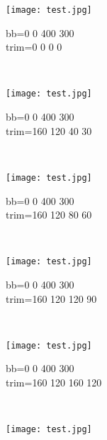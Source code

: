 \begin{figure}[h]
    \centering
    \begin{subfigure}[b]{0.3\textwidth}
        \texttt{[image: test.jpg]}
        \caption{bb=0 0 400 300\\trim=0 0 0 0}
        \label{essai_4}
    \end{subfigure}
    ~
    \begin{subfigure}[b]{0.3\textwidth}
        \texttt{[image: test.jpg]}
        \caption{bb=0 0 400 300\\trim=160 120 40 30}%
        \label{essai_5}
    \end{subfigure}
    ~
    \begin{subfigure}[b]{0.3\textwidth}
        \texttt{[image: test.jpg]}
        \caption{bb=0 0 400 300\\trim=160 120 80 60}%
        \label{essai_6}
    \end{subfigure}
    \\
    \begin{subfigure}[b]{0.3\textwidth}
        \texttt{[image: test.jpg]}
        \caption{bb=0 0 400 300\\trim=160 120 120 90}%
        \label{essai_4}
    \end{subfigure}
    ~
    \begin{subfigure}[b]{0.3\textwidth}
        \texttt{[image: test.jpg]}
        \caption{bb=0 0 400 300\\trim=160 120 160 120}%
        \label{essai_5}
    \end{subfigure}
    ~
    \begin{subfigure}[b]{0.3\textwidth}
        \texttt{[image: test.jpg]}

\end{subfigure}
\end{figure}
